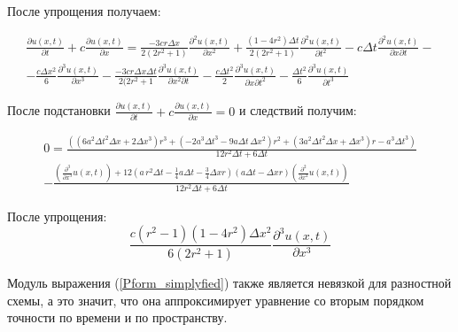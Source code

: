 \documentclass[a4paper, 14pt]{extreport}
\begin{document}
После упрощения получаем:
\begin{small}
\begin{eqnarray}
	\label{Gform_simplyfied}
	\frac{\partial u(x,t)}{\partial t} + c\frac{\partial u(x,t)}{\partial x} = \frac{-3cr\Delta x}{2(2r^2+1)}\frac{\partial^2 u(x,t)}{\partial x^2}+\frac{(1-4r^2)\Delta t}{2(2r^2+1)}\frac{\partial^2 u(x,t)}{\partial t^2}-c \Delta t \frac{\partial^2 u(x,t)}{\partial x\partial t}-\nonumber\\ - \frac{c\Delta x^2}{6}\frac{\partial^3 u(x,t)}{\partial x^3}-\frac{-3cr\Delta x\Delta t}{2(2r^2+1}\frac{\partial^3 u(x,t)}{\partial x^2\partial t}-\frac{c\Delta t^2}{2}\frac{\partial^3 u(x,t)}{\partial x\partial t^2}-\frac{\Delta t^2}{6}\frac{\partial^3 u(x,t)}{\partial t^3}
\end{eqnarray}
\end{small}

После подстановки $\frac{\partial u(x, t)}{\partial t} + c\frac{\partial u(x, t)}{\partial x} = 0$ и следствий получим:
\begin{small}
\begin{eqnarray}
	\label{P_form}
0 = \frac{\left(\left(6 a^{2} \Delta t^{2} \Delta x  +2 \Delta x^{3}\right) r^{3}+\left(-2 a^{3} \Delta t^{3}-9 a \Delta t  \,\Delta x^{2}\right) r^{2}+\left(3 a^{2} \Delta t^{2} \Delta x + \Delta x^{3}\right) r -a^{3} \Delta t^{3}\right) }{12 r^{2} \Delta t  +6 \Delta t}\\- \frac{\left(\frac{\partial^{3}}{\partial x^{3}}u \! \left(x ,t \right)\right)+12 \left(a \,r^{2} \Delta t  -\frac{1}{4} a \Delta t  -\frac{3}{4} \Delta x  r \right) \left(a \Delta t  -\Delta x  r \right) \left(\frac{\partial^{2}}{\partial x^{2}}u \! \left(x ,t \right)\right)}{12 r^{2} \Delta t  +6 \Delta t }
\end{eqnarray}
\end{small}

После упрощения:
\begin{equation}
	\frac{c(r^2-1)(1-4r^2)\Delta x^2}{6(2r^2+1)}\frac{\partial^3 u(x,t)}{\partial x^3}
	\label{Pform_simplyfied}
\end{equation}

Модуль выражения (\ref{Pform_simplyfied}) также является невязкой для разностной схемы, а это значит, что она аппроксимирует уравнение со вторым порядком точности по времени и по пространству.

\newpage
\end{document}
